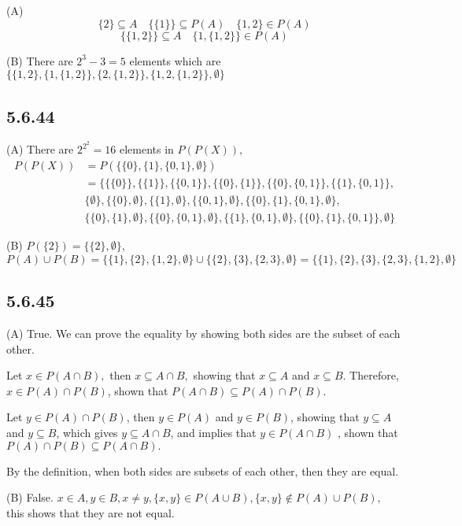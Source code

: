\documentclass{article}
\begin{document}
(A) $$\{2\}\subseteq A\quad \{\{1\}\} \subseteq P(A)  \quad \{1,2\}\in P(A)$$
$$\{\{1,2\}\}\subseteq A\quad \{1,\{1,2\}\}\in P(A)$$

(B) There are $2^3-3=5$ elements which are $\{\{1,2\},\{1,\{1,2\}\},\{2,\{1,2\}\},\{1,2,\{1,2\}\},\emptyset \}$

\subsection*{5.6.44}

(A) There are $2^{2^{2}}=16$ elements in $P(P(X)),$\begin{align*}
    P(P(X))&=P(\{\{0\},\{1\},\{0,1\},\emptyset\})\\
    &=\{\{\{0\}\},\{\{1\}\},\{\{0,1\}\},\{\{0\},\{1\}\},\{\{0\},\{0,1\}\},\{\{1\},\{0,1\}\},\\
    &\{\emptyset\},\{\{0\},\emptyset\},\{\{1\},\emptyset\},\{\{0,1\},\emptyset\},\{\{0\},\{1\},\{0,1\},\emptyset\},\\
    &\{\{0\},\{1\},\emptyset\},\{\{0\},\{0,1\},\emptyset\},\{\{1\},\{0,1\},\emptyset\},\{\{0\},\{1\},\{0,1\}\},\emptyset\}
\end{align*}

(B)  $P(\{2\})=\{\{2\},\emptyset\}$, $P(A)\cup P(B)=\{\{1\},\{2\},\{1,2\},\emptyset \}\cup\{\{2\},\{3\},\{2,3\},\emptyset\}=\{\{1\},\{2\},\{3\},\{2,3\},\{1,2\},\emptyset\}$

\subsection*{5.6.45}

(A) True. We can prove the equality by showing both sides are the subset of each other. 

Let $x\in P(A\cap B),$ then $x\subseteq A\cap B,$ showing that $x\subseteq A$ and $x\subseteq B$. Therefore, $x\in P(A)\cap P(B)$, shown that $P(A\cap B)\subseteq P(A) \cap P(B).$ 

Let $y\in P(A)\cap P(B)$, then $y\in P(A)$ and $y\in P(B)$, showing that $y\subseteq A$ and $y\subseteq B$, which gives $y\subseteq A\cap B$, and implies that $y\in P(A\cap B)$
, shown that  $P(A) \cap P(B)\subseteq P(A\cap B).$ 

By the definition, when both sides are subsets of each other, then they are equal. 

(B) False. $x\in A, y\in B, x\neq y,\{x,y\}\in P(A\cup B), \{x,y\}\notin P(A)\cup P(B),$ this shows that they are not equal. 
\end{document}

